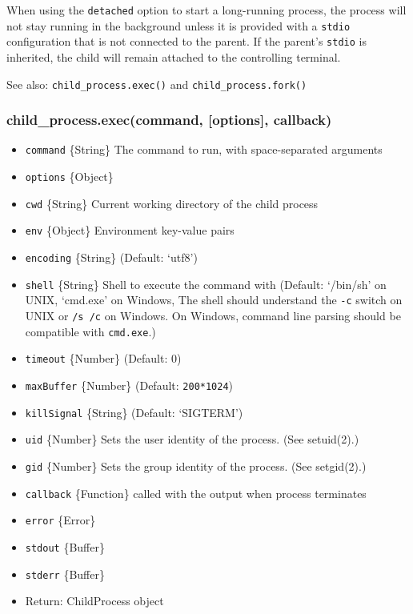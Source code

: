 When using the \texttt{detached} option to start a long-running process,
the process will not stay running in the background unless it is
provided with a \texttt{stdio} configuration that is not connected to
the parent. If the parent's \texttt{stdio} is inherited, the child will
remain attached to the controlling terminal.

See also: \texttt{child\_process.exec()} and
\texttt{child\_process.fork()}

\subsubsection{child\_process.exec(command, {[}options{]},
callback)}\label{childux5fprocess.execcommand-options-callback}

\begin{itemize}
\itemsep1pt\parskip0pt
\item
  \texttt{command} \{String\} The command to run, with space-separated
  arguments
\item
  \texttt{options} \{Object\}
\item
  \texttt{cwd} \{String\} Current working directory of the child process
\item
  \texttt{env} \{Object\} Environment key-value pairs
\item
  \texttt{encoding} \{String\} (Default: `utf8')
\item
  \texttt{shell} \{String\} Shell to execute the command with (Default:
  `/bin/sh' on UNIX, `cmd.exe' on Windows, The shell should understand
  the \texttt{-c} switch on UNIX or \texttt{/s /c} on Windows. On
  Windows, command line parsing should be compatible with
  \texttt{cmd.exe}.)
\item
  \texttt{timeout} \{Number\} (Default: 0)
\item
  \texttt{maxBuffer} \{Number\} (Default: \texttt{200*1024})
\item
  \texttt{killSignal} \{String\} (Default: `SIGTERM')
\item
  \texttt{uid} \{Number\} Sets the user identity of the process. (See
  setuid(2).)
\item
  \texttt{gid} \{Number\} Sets the group identity of the process. (See
  setgid(2).)
\item
  \texttt{callback} \{Function\} called with the output when process
  terminates
\item
  \texttt{error} \{Error\}
\item
  \texttt{stdout} \{Buffer\}
\item
  \texttt{stderr} \{Buffer\}
\item
  Return: ChildProcess object
\end{itemize}

